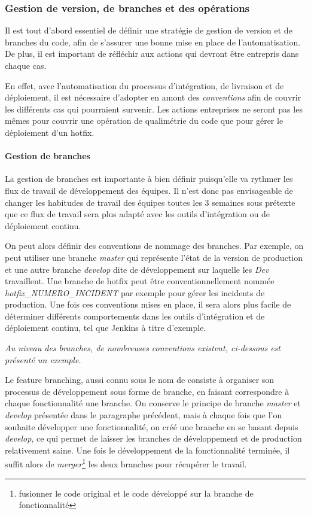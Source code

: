 \subsubsection{Gestion de version, de branches et des opérations}

Il est tout d'abord essentiel de définir une stratégie de gestion de version et de branches du code, afin de s'assurer une bonne mise en place de l'automatisation. De plus, il est important de réfléchir aux actions qui devront être entrepris dans chaque cas. 

En effet, avec l'automatisation du processus d'intégration, de livraison et de déploiement, il est nécessaire d'adopter en amont des \emph{conventions} afin de couvrir les différents cas qui pourraient survenir. Les actions entreprises ne seront pas les mêmes pour couvrir une opération de qualimétrie du code que pour gérer le déploiement d'un \gls{hotfix}.

\paragraph{Gestion de branches}

La gestion de branches est importante à bien définir puisqu'elle va rythmer les flux de travail de développement des équipes. Il n'est donc pas envisageable de changer les habitudes de travail des équipes toutes les 3 semaines sous prétexte que ce flux de travail sera plus adapté avec les outils d'intégration ou de déploiement continu.

On peut alors définir des conventions de nommage des branches. Par exemple, on peut utiliser une branche \emph{master} qui représente l'état de la version de production et une autre branche \emph{develop} dite de développement sur laquelle les \emph{Dev} travaillent. Une branche de \gls{hotfix} peut être conventionnellement nommée \emph{hotfix\_NUMERO\_INCIDENT} par exemple pour gérer les incidents de production. Une fois ces conventions mises en place, il sera alors plus facile de déterminer différents comportements dans les outils d'intégration et de déploiement continu, tel que Jenkins à titre d'exemple.

\emph{Au niveau des branches, de nombreuses conventions existent, ci-dessous est présenté un exemple.}

Le feature branching, aussi connu sous le nom de  consiste à organiser son processus de développement sous forme de branche, en faisant correspondre à chaque fonctionnalité une branche. On conserve le principe de branche \emph{master} et \emph{develop} présentée dans le paragraphe précédent, mais à chaque fois que l'on souhaite développer une fonctionnalité, on créé une branche en se basant depuis \emph{develop}, ce qui permet de laisser les branches de développement et de production relativement saine. Une fois le développement de la fonctionnalité terminée, il suffit alors de \emph{merger}\footnote{fusionner le code original et le code développé sur la branche de fonctionnalité} les deux branches pour récupérer le travail.

